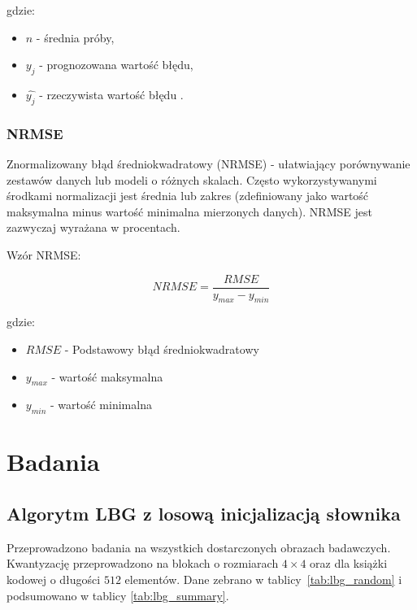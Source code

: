 \documentclass{article}
\begin{document}
gdzie:
\begin{itemize}[label=]
    \item $n$ - średnia próby,
    \item $y_{j}$ - prognozowana wartość błędu,
    \item $\hat{y_{j}}$ - rzeczywista wartość błędu \cite{rmse}.
\end{itemize}

\subsubsection{NRMSE}

Znormalizowany błąd średniokwadratowy (NRMSE) - ułatwiający porównywanie zestawów danych lub modeli o różnych skalach. Często wykorzystywanymi środkami normalizacji jest średnia lub zakres (zdefiniowany jako wartość maksymalna minus wartość minimalna mierzonych danych). NRMSE jest zazwyczaj wyrażana w procentach.

Wzór NRMSE:

\begin{equation}
NRMSE = \frac{RMSE}{y_{max} - y_{min}}
\end{equation}

gdzie:
\begin{itemize}[label=]
    \item $RMSE$ - Podstawowy błąd średniokwadratowy
    \item $y_{max}$ - wartość maksymalna
    \item $y_{min}$ - wartość minimalna
\end{itemize}

\section{Badania}

\subsection{Algorytm LBG z losową inicjalizacją słownika}

Przeprowadzono badania na wszystkich dostarczonych obrazach badawczych. Kwantyzację przeprowadzono na blokach o rozmiarach $4 \times 4$ oraz dla książki
kodowej o długości $512$ elementów. Dane zebrano w \mbox{tablicy \ref{tab:lbg_random}} i podsumowano w tablicy \mbox{\ref{tab:lbg_summary}}.
\end{document}
